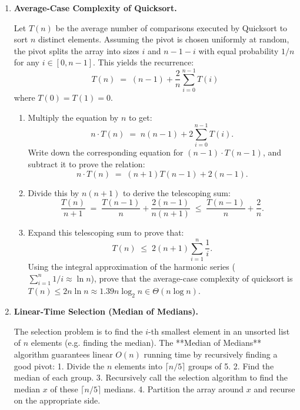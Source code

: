 \documentclass[12pt, a4paper]{book}
\begin{document}
\begin{deepbox}
\begin{enumerate}[label=\textbf{D\arabic*.}]
  \item \textbf{Average-Case Complexity of Quicksort.}
  
        Let $T(n)$ be the average number of comparisons executed by Quicksort to sort $n$ distinct elements.
        Assuming the pivot is chosen uniformly at random, the pivot splits the array into sizes $i$ and $n-1-i$ with equal probability $1/n$ for any $i \in [0, n-1]$.
        This yields the recurrence:
        \[
          T(n) \;=\; (n-1) + \frac{2}{n} \sum_{i=0}^{n-1} T(i)
        \]
        where $T(0) = T(1) = 0$.
        
        \begin{enumerate}[label=(\alph*)]
          \item Multiply the equation by $n$ to get:
                \[
                  n \cdot T(n) \;=\; n(n-1) + 2 \sum_{i=0}^{n-1} T(i).
                \]
                Write down the corresponding equation for $(n-1) \cdot T(n-1)$, and subtract it to prove the relation:
                \[
                  n \cdot T(n) \;=\; (n+1) T(n-1) + 2(n-1).
                \]
          \item Divide this by $n(n+1)$ to derive the telescoping sum:
                \[
                  \frac{T(n)}{n+1} \;=\; \frac{T(n-1)}{n} + \frac{2(n-1)}{n(n+1)} \;\le\; \frac{T(n-1)}{n} + \frac{2}{n}.
                \]
          \item Expand this telescoping sum to prove that:
                \[
                  T(n) \;\le\; 2 (n+1) \sum_{i=1}^n \frac{1}{i}.
                \]
                Using the integral approximation of the harmonic series ($\sum_{i=1}^n 1/i \approx \ln n$), prove that the average-case complexity of quicksort is $T(n) \le 2 n \ln n \approx 1.39 n \log_2 n \in \Theta(n \log n)$.
        \end{enumerate}

  \item \textbf{Linear-Time Selection (Median of Medians).}
  
        The selection problem is to find the $i$-th smallest element in an unsorted list of $n$ elements (e.g. finding the median).
        The **Median of Medians** algorithm guarantees linear $O(n)$ running time by recursively finding a good pivot:
        1. Divide the $n$ elements into $\lceil n/5 \rceil$ groups of 5.
        2. Find the median of each group.
        3. Recursively call the selection algorithm to find the median $x$ of these $\lceil n/5 \rceil$ medians.
        4. Partition the array around $x$ and recurse on the appropriate side.
        

\end{enumerate}
\end{deepbox}
\end{document}
